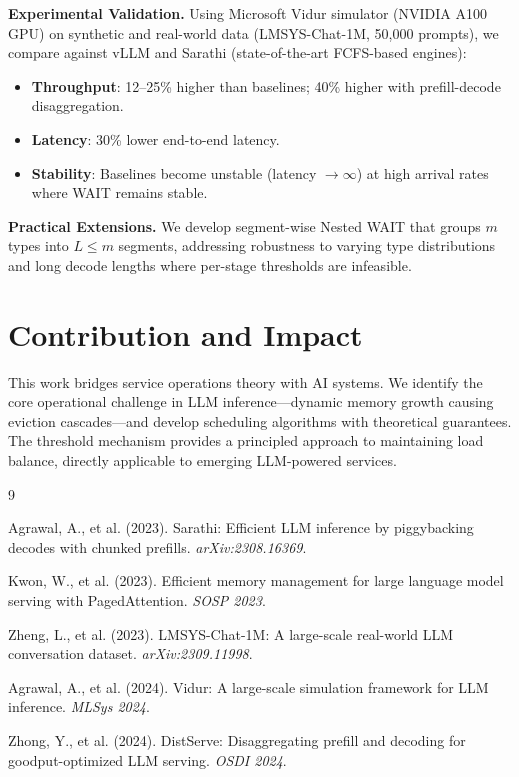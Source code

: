 \documentclass[11pt]{article}
\begin{document}
\textbf{Experimental Validation.} Using Microsoft Vidur simulator (NVIDIA A100 GPU) on synthetic and real-world data (LMSYS-Chat-1M, 50,000 prompts), we compare against vLLM and Sarathi (state-of-the-art FCFS-based engines):
\begin{itemize}
    \item \textbf{Throughput}: 12--25\% higher than baselines; 40\% higher with prefill-decode disaggregation.
    \item \textbf{Latency}: 30\% lower end-to-end latency.
    \item \textbf{Stability}: Baselines become unstable (latency $\to \infty$) at high arrival rates where WAIT remains stable.
\end{itemize}

\textbf{Practical Extensions.} We develop segment-wise Nested WAIT that groups $m$ types into $L \leq m$ segments, addressing robustness to varying type distributions and long decode lengths where per-stage thresholds are infeasible.

\section*{Contribution and Impact}

This work bridges service operations theory with AI systems. We identify the core operational challenge in LLM inference---dynamic memory growth causing eviction cascades---and develop scheduling algorithms with theoretical guarantees. The threshold mechanism provides a principled approach to maintaining load balance, directly applicable to emerging LLM-powered services.

\vspace{0.5em}
\small

\begin{thebibliography}{9}

 Agrawal, A., et al. (2023). Sarathi: Efficient LLM inference by piggybacking decodes with chunked prefills. \textit{arXiv:2308.16369}.

 Kwon, W., et al. (2023). Efficient memory management for large language model serving with PagedAttention. \textit{SOSP 2023}.

 Zheng, L., et al. (2023). LMSYS-Chat-1M: A large-scale real-world LLM conversation dataset. \textit{arXiv:2309.11998}.

 Agrawal, A., et al. (2024). Vidur: A large-scale simulation framework for LLM inference. \textit{MLSys 2024}.

 Zhong, Y., et al. (2024). DistServe: Disaggregating prefill and decoding for goodput-optimized LLM serving. \textit{OSDI 2024}.

\end{thebibliography}
\end{document}

